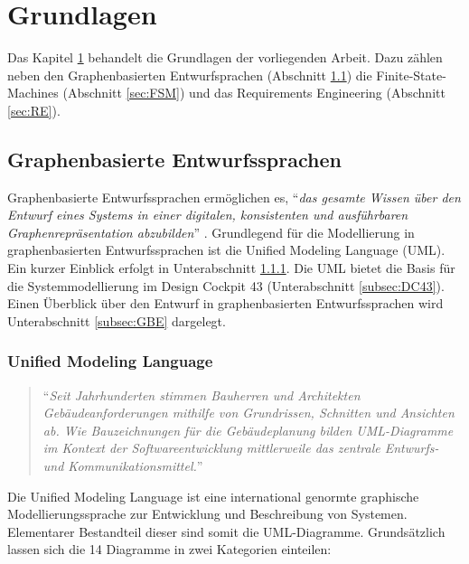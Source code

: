 \chapter{Grundlagen}
\label{chap:Grundlagen}
Das Kapitel \ref{chap:Grundlagen} behandelt die Grundlagen der vorliegenden Arbeit. Dazu zählen neben den Graphenbasierten Entwurfsprachen (Abschnitt \ref{sec:GBES}) die Finite-State-Machines (Abschnitt \ref{sec:FSM}) und das Requirements Engineering (Abschnitt \ref{sec:RE}).
	
\section{Graphenbasierte Entwurfssprachen}
\label{sec:GBES}
Graphenbasierte Entwurfssprachen ermöglichen es, "`\textit{das gesamte Wissen über den Entwurf eines Systems in einer digitalen, \mbox{konsistenten} und ausführbaren Graphenrepräsentation abzubilden}"' \cite{IIL17}. Grundlegend für die Modellierung in graphenbasierten Entwurfssprachen ist die Unified Modeling Language (UML). Ein kurzer Einblick erfolgt in Unterabschnitt \ref{subsec:UML}. Die UML bietet die Basis für die Systemmodellierung im Design Cockpit 43\textsuperscript{\textregistered} (Unterabschnitt \ref{subsec:DC43}). Einen Überblick über den Entwurf in graphenbasierten Entwurfssprachen wird Unterabschnitt \ref{subsec:GBE} dargelegt.

\subsection{Unified Modeling Language}
\label{subsec:UML}
\begin{quote}
	"`\textit{Seit Jahrhunderten stimmen Bauherren und Architekten Gebäudeanforderungen mithilfe
		von Grundrissen, Schnitten und Ansichten ab. Wie Bauzeichnungen für die Gebäudeplanung
		bilden UML-Diagramme im Kontext der Softwareentwicklung mittlerweile das zentrale
		Entwurfs- und Kommunikationsmittel.}"'\cite{RBF16}
\end{quote}
 Die Unified Modeling Language ist eine international genormte graphische Modellierungssprache zur  Entwicklung und Beschreibung von Systemen. Elementarer Bestandteil dieser sind somit die UML-Diagramme. Grundsätzlich lassen sich die 14 Diagramme in zwei Kategorien einteilen:\\
 
